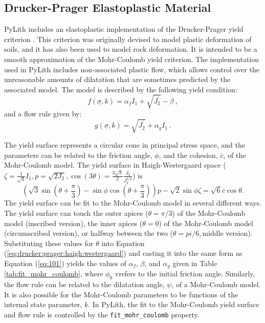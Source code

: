 \subsection{Drucker-Prager Elastoplastic Material}

PyLith includes an elastoplastic implementation of the Drucker-Prager
yield criterion \cite{Drucker:Prager:1952}. This criterion was originally
devised to model plastic deformation of soils, and it has also been
used to model rock deformation. It is intended to be a smooth approximation
of the Mohr-Coulomb yield criterion. The implementation used in PyLith
includes non-associated plastic flow, which allows control over the
unreasonable amounts of dilatation that are sometimes predicted by
the associated model. The model is described by the following yield
condition:
\begin{equation}
f\left(\underline{\sigma},k\right)=\alpha_{f}I_{1}+\sqrt{J_{2}^{\prime}}-\beta\:,\label{eq:100}
\end{equation}
and a flow rule given by:
\begin{equation}
g\left(\underline{\sigma},k\right)=\sqrt{J_{2}^{\prime}}+\alpha_{g}I_{1}\:.\label{eq:101}
\end{equation}


The yield surface represents a circular cone in principal stress space,
and the parameters can be related to the friction angle, $\phi$,
and the cohesion, $\bar{c}$, of the Mohr-Coulomb model. The yield
surface in Haigh-Westergaard space ($\zeta=\frac{1}{\sqrt{3}}I_{1},p=\sqrt{2J_{2}},\cos(3\theta)=\frac{3\sqrt{3}}{2}\frac{J_{3}}{J_{2}^{3/2}}$)
is
\begin{equation}
\left(\sqrt{3}\sin\left(\theta+\frac{\pi}{3}\right)-\sin\phi\cos\left(\theta+\frac{\pi}{3}\right)\right)p-\sqrt{2}\sin\phi\zeta=\sqrt{6}\overline{c}\cos\theta.\label{eq:drucker:prager:haigh:westergaard}
\end{equation}
The yield surface can be fit to the Mohr-Coulomb model in several
different ways. The yield surface can touch the outer apices ($\theta=\pi/3$)
of the Mohr-Coulomb model (inscribed version), the inner apices ($\theta=0$)
of the Mohr-Coulomb model (circumscribed version), or halfway between
the two ($\theta=pi/6,$middle version). Substituting these values
for $\theta$ into Equation (\vref{eq:drucker:prager:haigh:westergaard})
and casting it into the same form as Equation (\vref{eq:101}) yields
the values of $\alpha_{f}$, $\beta$, and $\alpha_{g}$ given in
Table \vref{tab:fit_mohr_coulomb}, where $\phi_{0}$ vrefers to the
initial friction angle. Similarly, the flow rule can be related to
the dilatation angle, $\psi$, of a Mohr-Coulomb model. It is also
possible for the Mohr-Coulomb parameters to be functions of the internal
state parameter, $k$. In PyLith, the fit to the Mohr-Coulomb yield
surface and flow rule is controlled by the \texttt{fit\_mohr\_coulomb}
property. 

